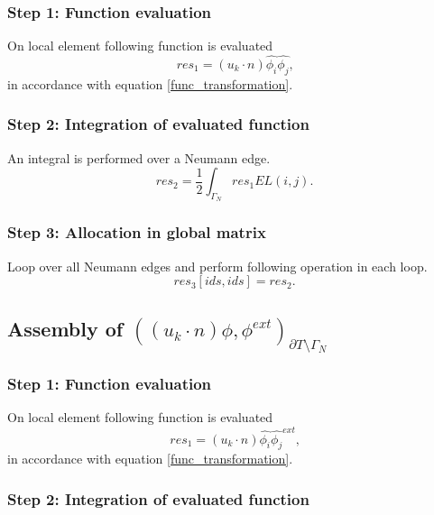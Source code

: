 \documentclass[a4paper,twoside,openright]{book}
\begin{document}
\subsubsection{Step 1: Function evaluation}

On local element following function is evaluated
\begin{equation}
res_1 = (u_k \cdot n) \hat{\phi_i} \hat{\phi_j} \textrm{,}
\end{equation} 
in accordance with equation \eqref{func_transformation}.\\

\subsubsection{Step 2: Integration of evaluated function}

An integral is performed over a Neumann edge. 
\begin{equation}
res_2 = \frac{1}{2}  \int_{\Gamma_N} res_1 EL(i,j) \textrm{.}
\end{equation}

\subsubsection{Step 3: Allocation in global matrix}

Loop over all Neumann edges and perform following operation in each loop.
\begin{equation}
res_3[ids,ids] = res_2 \textrm{.}
\end{equation}

\subsection{Assembly of $((u_k \cdot n)\phi,\phi^{ext})_{\partial T \setminus \Gamma_N}$}

\subsubsection{Step 1: Function evaluation}

On local element following function is evaluated 
\begin{equation}
res_1  = (u_k \cdot n) \hat{\phi_i} \hat{\phi_j}^{ext} \textrm{,}
\end{equation}
in accordance with equation \eqref{func_transformation}.

\subsubsection{Step 2: Integration of evaluated function}
\end{document}
